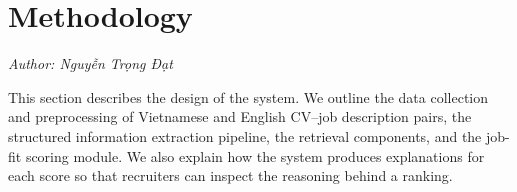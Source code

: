 \section{Methodology}
\noindent\textit{Author: Nguyễn Trọng Đạt}


This section describes the design of the system. We outline the data
collection and preprocessing of Vietnamese and English CV--job description
pairs, the structured information extraction pipeline, the retrieval
components, and the job-fit scoring module. We also explain how the system
produces explanations for each score so that recruiters can inspect the
reasoning behind a ranking.
